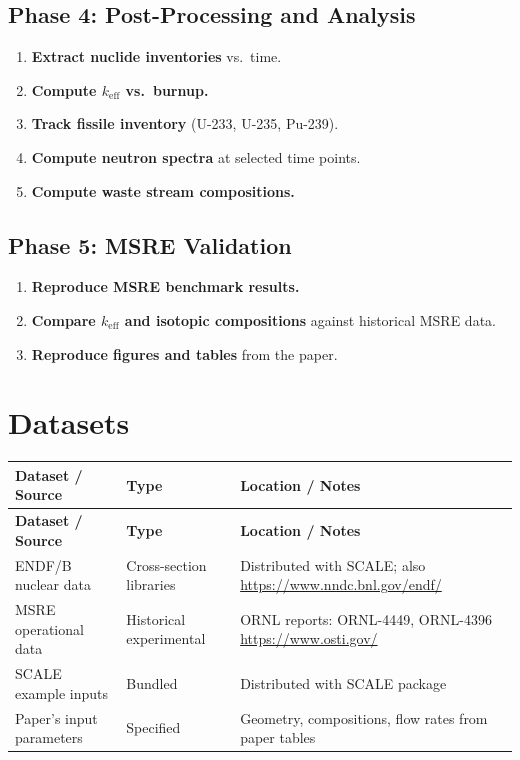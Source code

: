 \documentclass[11pt,a4paper]{article}
\begin{document}
\subsection{Phase 4: Post-Processing and Analysis}
\begin{enumerate}[label=\textbf{4.\arabic*}]
  \item \textbf{Extract nuclide inventories} vs.\ time.
  \item \textbf{Compute $k_{\text{eff}}$ vs.\ burnup.}
  \item \textbf{Track fissile inventory} (U-233, U-235, Pu-239).
  \item \textbf{Compute neutron spectra} at selected time points.
  \item \textbf{Compute waste stream compositions.}
\end{enumerate}

\subsection{Phase 5: MSRE Validation}
\begin{enumerate}[label=\textbf{5.\arabic*}]
  \item \textbf{Reproduce MSRE benchmark results.}
  \item \textbf{Compare $k_{\text{eff}}$ and isotopic compositions} against historical MSRE data.
  \item \textbf{Reproduce figures and tables} from the paper.
\end{enumerate}

\section{Datasets}

\begin{longtable}{p{4.5cm} p{3.5cm} p{6cm}}
\toprule
\textbf{Dataset / Source} & \textbf{Type} & \textbf{Location / Notes} \\
\midrule
\endfirsthead
\toprule
\textbf{Dataset / Source} & \textbf{Type} & \textbf{Location / Notes} \\
\midrule
\endhead
ENDF/B nuclear data & Cross-section libraries & Distributed with SCALE; also \url{https://www.nndc.bnl.gov/endf/} \\
\midrule
MSRE operational data & Historical experimental & ORNL reports: ORNL-4449, ORNL-4396 \newline \url{https://www.osti.gov/} \\
\midrule
SCALE example inputs & Bundled & Distributed with SCALE package \\
\midrule
Paper's input parameters & Specified & Geometry, compositions, flow rates from paper tables \\
\bottomrule
\end{longtable}
\end{document}
